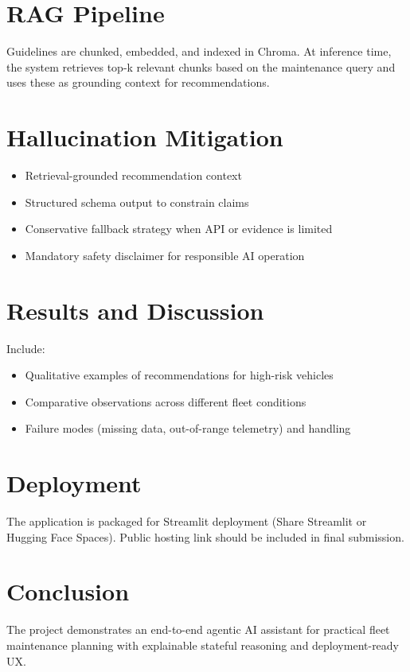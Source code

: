 \documentclass[12pt]{article}
\begin{document}
\section{RAG Pipeline}
Guidelines are chunked, embedded, and indexed in Chroma. At inference time, the system retrieves top-k relevant chunks based on the maintenance query and uses these as grounding context for recommendations.

\section{Hallucination Mitigation}
\begin{itemize}[noitemsep]
    \item Retrieval-grounded recommendation context
    \item Structured schema output to constrain claims
    \item Conservative fallback strategy when API or evidence is limited
    \item Mandatory safety disclaimer for responsible AI operation
\end{itemize}

\section{Results and Discussion}
Include:
\begin{itemize}
    \item Qualitative examples of recommendations for high-risk vehicles
    \item Comparative observations across different fleet conditions
    \item Failure modes (missing data, out-of-range telemetry) and handling
\end{itemize}

\section{Deployment}
The application is packaged for Streamlit deployment (Share Streamlit or Hugging Face Spaces). Public hosting link should be included in final submission.

\section{Conclusion}
The project demonstrates an end-to-end agentic AI assistant for practical fleet maintenance planning with explainable stateful reasoning and deployment-ready UX.
\end{document}
